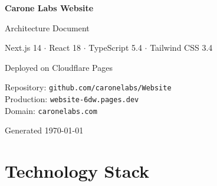 \documentclass[11pt,a4paper]{article}
\begin{document}
\begin{titlepage}
\centering
\vspace*{2cm}
{\Huge\bfseries\textcolor{carone-dark}{Carone Labs Website}\par}
\vspace{0.5cm}
{\LARGE\textcolor{carone-orange}{Architecture Document}\par}
\vspace{1.5cm}
{\large\textcolor{carone-green}{Next.js 14 $\cdot$ React 18 $\cdot$ TypeScript 5.4 $\cdot$ Tailwind CSS 3.4}\par}
\vspace{0.5cm}
{\large Deployed on Cloudflare Pages\par}
\vspace{2cm}


\vfill
{\large Repository: \texttt{github.com/caronelabs/Website}\\[0.3cm]
Production: \texttt{website-6dw.pages.dev}\\[0.3cm]
Domain: \texttt{caronelabs.com}\par}
\vspace{1cm}
{\small Generated \today\par}
\end{titlepage}

\tableofcontents
\newpage

\section{Technology Stack}
\end{document}
